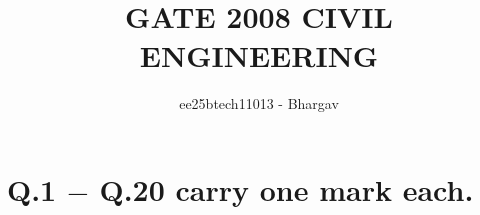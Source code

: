 \documentclass[journal]{IEEEtran}
\begin{document}

\vspace{3cm}


\title{GATE 2008 CIVIL ENGINEERING}
\author{ee25btech11013 - Bhargav}
\maketitle
{\let\newpage\relax\maketitle}

\renewcommand{\thefigure}{\theenumi}
\renewcommand{\thetable}{\theenumi}
\setlength{\intextsep}{10pt} %


\section*{Q.1 $-$ Q.20 carry one mark each.}
\end{document}
